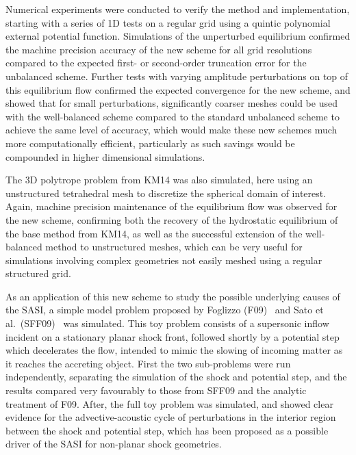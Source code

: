 Numerical experiments were conducted to verify the method and implementation, starting with a series of 1D tests on a regular grid using a quintic polynomial external potential function. Simulations of the unperturbed equilibrium confirmed the machine precision accuracy of the new scheme for all grid resolutions compared to the expected first- or second-order truncation error for the unbalanced scheme. Further tests with varying amplitude perturbations on top of this equilibrium flow confirmed the expected convergence for the new scheme, and showed that for small perturbations, significantly coarser meshes could be used with the well-balanced scheme compared to the standard unbalanced scheme to achieve the same level of accuracy, which would make these new schemes much more computationally efficient, particularly as such savings would be compounded in higher dimensional simulations.

The 3D polytrope problem from KM14 was also simulated, here using an unstructured tetrahedral mesh to discretize the spherical domain of interest. Again, machine precision maintenance of the equilibrium flow was observed for the new scheme, confirming both the recovery of the hydrostatic equilibrium of the base method from KM14, as well as the successful extension of the well-balanced method to unstructured meshes, which can be very useful for simulations involving complex geometries not easily meshed using a regular structured grid.

As an application of this new scheme to study the possible underlying causes of the SASI, a simple model problem proposed by Foglizzo (F09)~\cite{Foglizzo2009} and Sato et al.\ (SFF09)~\cite{Sato2009} was simulated. This toy problem consists of a supersonic inflow incident on a stationary planar shock front, followed shortly by a potential step which decelerates the flow, intended to mimic the slowing of incoming matter as it reaches the accreting object. First the two sub-problems were run independently, separating the simulation of the shock and potential step, and the results compared very favourably to those from SFF09 and the analytic treatment of F09. After, the full toy problem was simulated, and showed clear evidence for the advective-acoustic cycle of perturbations in the interior region between the shock and potential step, which has been proposed as a possible driver of the SASI for non-planar shock geometries.
